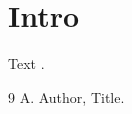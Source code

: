 \documentclass{article}
\begin{document}
\tableofcontents
\listoffigures
\tocsection
{}
\section{Intro}
Text \cite{a}.
\begin{thebibliography}{9}
 A. Author, Title.
\end{thebibliography}
\end{document}
